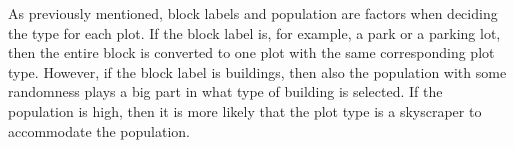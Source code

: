 As previously mentioned, block labels and population are factors when deciding the type for each plot. 
If the block label is, for example, a park or a parking lot, then the entire block is converted to one plot with the same corresponding plot type. 
However, if the block label is buildings, then also the population with some randomness plays a big part in what type of building is selected. 
If the population is high, then it is more likely that the plot type is a skyscraper to accommodate the population. 
